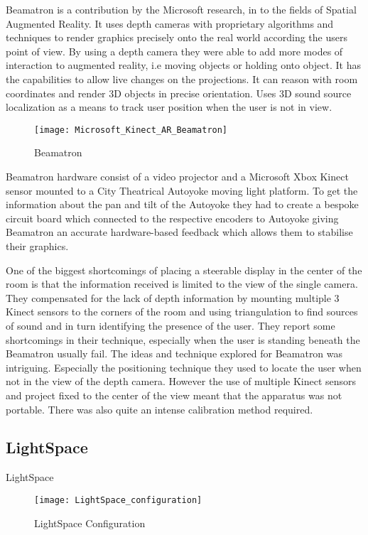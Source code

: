 Beamatron \cite{beamatron} is a contribution by the Microsoft research,
in to the fields of Spatial Augmented Reality. It uses depth cameras
with proprietary algorithms and techniques to render graphics precisely
onto the real world according the users point of view. By using a
depth camera they were able to add more modes of interaction to augmented
reality, i.e moving objects or holding onto object. It has the capabilities
to allow live changes on the projections. It can reason with room
coordinates and render 3D objects in precise orientation. Uses 3D
sound source localization as a means to track user position when the
user is not in view. 
\begin{figure}
\centering
\texttt{[image: Microsoft\_Kinect\_AR\_Beamatron]}
\protect\caption{Beamatron}
\end{figure}
Beamatron hardware consist of a video projector and a Microsoft Xbox
Kinect sensor mounted to a City Theatrical Autoyoke\cite{autoyoke}
moving light platform. To get the information about the pan and tilt
of the Autoyoke they had to create a bespoke circuit board which connected
to the respective encoders to Autoyoke giving Beamatron an accurate
hardware-based feedback which allows them to stabilise their graphics. 

One of the biggest shortcomings of placing a steerable display in
the center of the room is that the information received is limited
to the view of the single camera. They compensated for the lack of
depth information by mounting multiple 3 Kinect sensors to the corners
of the room and using triangulation to find sources of sound and in
turn identifying the presence of the user. They report some shortcomings
in their technique, especially when the user is standing beneath the
Beamatron usually fail.
The ideas and technique explored for Beamatron was intriguing. Especially
the positioning technique they used to locate the user when not in
the view of the depth camera. However the use of multiple Kinect sensors
and project fixed to the center of the view meant that the apparatus
was not portable. There was also quite an intense calibration method
required.


\subsection{LightSpace}
LightSpace
\begin{figure}[H]
\centering
\texttt{[image: LightSpace\_configuration]}

\protect\caption{LightSpace Configuration}
\end{figure}



